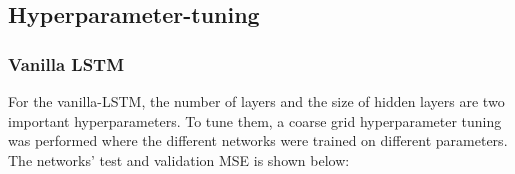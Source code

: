 \documentclass{article}
\begin{document}
\subsection{Hyperparameter-tuning}
\subsubsection{Vanilla LSTM}
For the vanilla-LSTM, the number of layers and the size of hidden layers are two important hyperparameters. To tune them, a coarse grid hyperparameter tuning was performed where the different networks were trained on different parameters. The networks' test and validation MSE is shown below:
\end{document}
